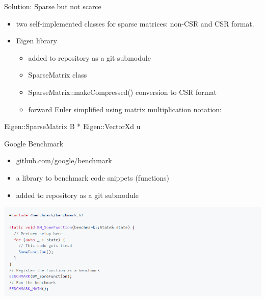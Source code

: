 \documentclass[aspectratio=169,xcolor=dvipsnames]{beamer}
\begin{document}
\begin{frame}{Solution: Sparse but not scarce}
    \begin{itemize}
        \item two self-implemented classes for sparse matrices: non-CSR and CSR format.
        \item Eigen library
        \begin{itemize}
        	\item added to repository as a git submodule
        	\item SparseMatrix class
        	\item SparseMatrix::makeCompressed() conversion to CSR format
        	\item forward Euler simplified using matrix multiplication notation: 	
        \end{itemize}
    \end{itemize}	
    \centerline{Eigen::SparseMatrix B * Eigen::VectorXd u}
\end{frame}



\begin{frame}{Google Benchmark}
    \begin{itemize}
        \item github.com/google/benchmark
        \item a library to benchmark code snippets (functions) 
        \item added to repository as a git submodule
    \end{itemize}
    
    \begin{center}
    \includegraphics[width=0.8\linewidth]{example_google_benchmark.png}
    \end{center}
\end{frame}

\end{document}
